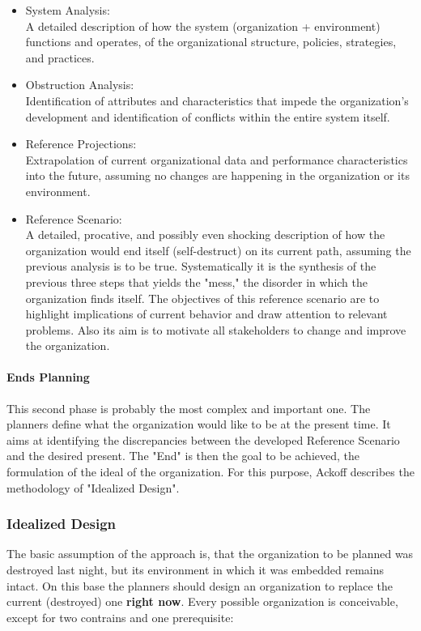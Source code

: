 \documentclass[a4paper,12pt]{scrartcl}
\begin{document}
\begin{itemize}
\item System Analysis:\\
A detailed description of how the system (organization + environment) functions and operates, of the organizational structure, policies, strategies, and practices.

\item Obstruction Analysis:\\
Identification of attributes and characteristics that impede the organization's development and identification of conflicts within the entire system itself.

\item Reference Projections:\\
Extrapolation of current organizational data and performance characteristics into the future, assuming no changes are happening in the organization or its environment.

\item Reference Scenario:\\
A detailed, procative, and possibly even shocking description of how the organization would end itself (self-destruct) on its current path, assuming the previous analysis is to be true. Systematically it is the synthesis of the previous three steps that yields the "mess," the disorder in which the organization finds itself. 
The objectives of this reference scenario are to highlight implications of current behavior and draw attention to relevant problems. Also its aim is to motivate all stakeholders to change and improve the organization.
\end{itemize}


\paragraph{Ends Planning} 

This second phase is probably the most complex and important one. The planners define what the organization would like to be at the present time. It aims at identifying the discrepancies between the developed Reference Scenario and the desired present. The "End" is then the goal to be achieved, the formulation of the ideal of the organization. 
For this purpose, Ackoff describes the methodology of "Idealized Design".


\subsubsection{Idealized Design}
The basic assumption of the approach is, that the organization to be planned was destroyed last night, but its environment in which it was embedded remains intact. On this base the planners should design an organization to replace the current (destroyed) one \textbf{right now}.
Every possible organization is conceivable, except for two contrains and one prerequisite:
\end{document}
